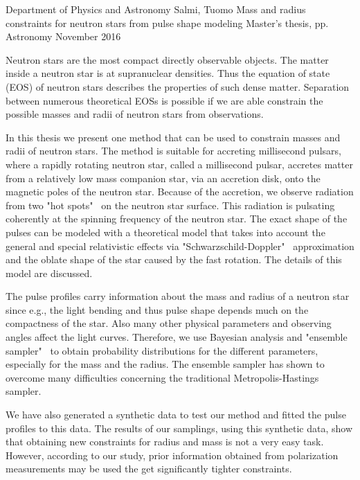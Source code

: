 \documentclass{wihuri}
\begin{document}
\begin{tiivistelma}%
        {Department of Physics and Astronomy}%
        {Salmi, Tuomo}%
        {Mass and radius constraints for neutron stars
from pulse shape modeling}
        {Master's thesis, \pageref{LastPage} pp.}%
        {Astronomy}%
        {November 2016}%

	Neutron stars are the most compact directly observable objects. The matter inside a neutron star is at supranuclear densities. Thus the equation of state (EOS) of neutron stars describes the properties of such dense matter. Separation between numerous theoretical EOSs is possible if we are able constrain the possible masses and radii of neutron stars from observations.
	
In this thesis we present one method that can be used to constrain masses and radii of neutron stars. The method is suitable for accreting millisecond pulsars, where a rapidly rotating neutron star, called a millisecond pulsar, accretes matter from a relatively low mass companion star, via an accretion disk, onto the magnetic poles of the neutron star. Because of the accretion, we observe radiation from two "hot spots" \ on the neutron star surface. This radiation is pulsating coherently at the spinning frequency of the neutron star. The exact shape of the pulses can be modeled with a  theoretical model that takes into account the general and special relativistic effects via "Schwarzschild-Doppler" \ approximation and the oblate shape of the star caused by the fast rotation. The details of this model are discussed. 
	
The pulse profiles carry information about the mass and radius of a neutron star since e.g., the light bending and thus pulse shape depends much on the compactness of the star. Also many other physical parameters and observing angles affect the light curves. Therefore, we use Bayesian analysis and "ensemble sampler" \ to obtain probability distributions for the different parameters, especially for the mass and the radius. The ensemble sampler has shown to overcome many difficulties concerning the traditional Metropolis-Hastings sampler. 

We have also generated a synthetic data to test our method and fitted the pulse profiles to this data. The results of our samplings, using this synthetic data, show that obtaining new constraints for radius and mass is not a very easy task. However, according to our study, prior information obtained from polarization measurements may be used the get significantly tighter constraints.  

	
	
\end{tiivistelma}
\end{document}
